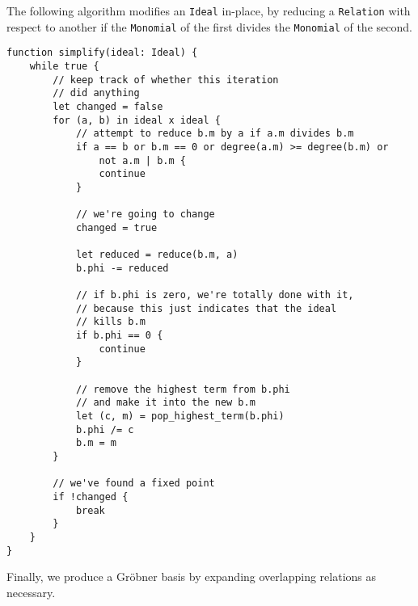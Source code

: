 \begin{alg}
    The following algorithm modifies an \verb|Ideal| in-place, by reducing a \verb|Relation|
    with respect to another if the \verb|Monomial| of the first divides the \verb|Monomial|
    of the second.
\begin{verbatim}
function simplify(ideal: Ideal) {
    while true {
        // keep track of whether this iteration 
        // did anything
        let changed = false
        for (a, b) in ideal x ideal {
            // attempt to reduce b.m by a if a.m divides b.m
            if a == b or b.m == 0 or degree(a.m) >= degree(b.m) or 
                not a.m | b.m {
                continue
            }
            
            // we're going to change
            changed = true
            
            let reduced = reduce(b.m, a)
            b.phi -= reduced
            
            // if b.phi is zero, we're totally done with it,
            // because this just indicates that the ideal
            // kills b.m
            if b.phi == 0 {
                continue
            }
            
            // remove the highest term from b.phi
            // and make it into the new b.m
            let (c, m) = pop_highest_term(b.phi)
            b.phi /= c
            b.m = m
        }
        
        // we've found a fixed point
        if !changed {
            break
        }
    }
}
\end{verbatim}
\end{alg}

Finally, we produce a Gr\"obner basis by expanding overlapping relations as
necessary.

